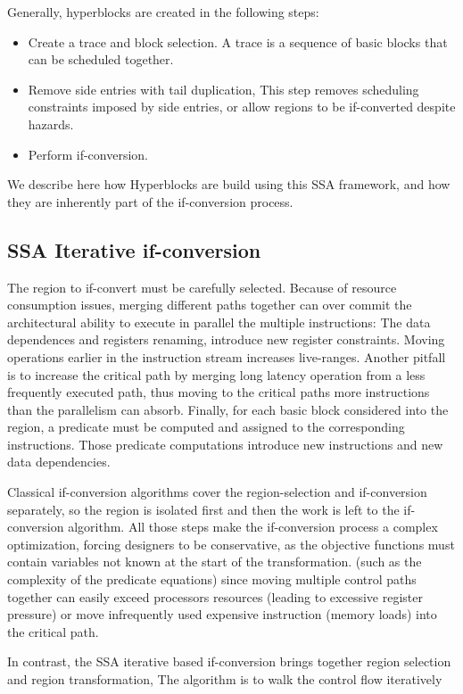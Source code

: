 Generally, hyperblocks are created in the following steps:
\begin{itemize}
\item Create a trace and block selection. A trace is a sequence of basic blocks that can be scheduled together. 
\item Remove side entries with tail duplication, This step removes scheduling constraints imposed by side entries, or allow regions to be if-converted despite hazards.
\item Perform if-conversion.
\end{itemize}

We describe here how Hyperblocks are build using this SSA framework, and how they are inherently part of the if-conversion process.

\subsection{SSA Iterative if-conversion}

The region to if-convert must be carefully selected. Because of resource consumption issues, merging different paths together can over commit the architectural ability to execute in parallel the multiple instructions: The data dependences and registers renaming, introduce new register constraints. Moving operations earlier in the instruction stream increases live-ranges. 
Another pitfall is to increase the critical path by merging long latency operation from a less frequently executed path, thus moving to the critical paths more instructions than the parallelism can absorb.
Finally, for each basic block considered into the region, a predicate must be computed and assigned to the corresponding instructions. Those predicate computations introduce new instructions and new data dependencies.

Classical if-conversion algorithms cover the region-selection and if-conversion separately, so the region is isolated first and then the work is left to the if-conversion algorithm. All those steps make the if-conversion process a complex optimization, forcing designers to be conservative, as the objective functions must contain variables not known at the start of the transformation. (such as the complexity of the predicate equations) since moving multiple control paths together can easily exceed processors resources (leading to excessive register pressure) or move infrequently used expensive instruction (memory loads) into the critical path. 

In contrast, the SSA iterative based if-conversion  brings together region selection and region transformation, The algorithm is to walk the control flow iteratively 

